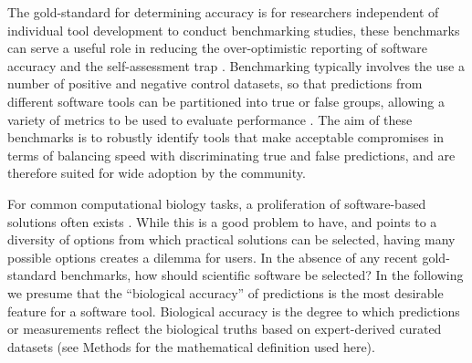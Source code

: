\documentclass[fleqn,10pt]{SelfArx} %
\begin{document}
The gold-standard for determining accuracy is for researchers independent
of individual tool development to conduct benchmarking studies, these benchmarks can serve a useful role in
reducing the over-optimistic reporting of software accuracy
\cite{Boulesteix2010-te,Jelizarow2010-zf,Weber:2019} and the self-assessment trap
\cite{Norel2011-cq,Buchka:2021}. Benchmarking typically involves the use a number of
positive and negative control datasets, so that predictions from different software tools can be
partitioned into true or false groups, allowing a variety of metrics to be
used to evaluate performance
\cite{Egan1975-nd,Hall2012-kg,Weber:2019}.
The aim of these benchmarks is to robustly identify tools that
make acceptable compromises in terms of balancing speed with
discriminating true and false predictions, and are therefore suited
for wide adoption by the community.

For common computational biology tasks, a proliferation of
software-based solutions often exists
\cite{Felsenstein1995-ic,Altschul2013-bv,Henry2014-ut}. While
this is a good problem to have, and points to a
diversity of options from which practical solutions can be selected,
having many possible options creates a dilemma for users. In the absence of
any recent gold-standard benchmarks, how should scientific software be
selected? In the following we presume that the ``biological
accuracy'' of predictions is the most desirable feature for a software tool. Biological
accuracy is the degree to which predictions or measurements reflect
the biological truths based on expert-derived curated datasets (see Methods for the  mathematical definition used here). 
\end{document}
